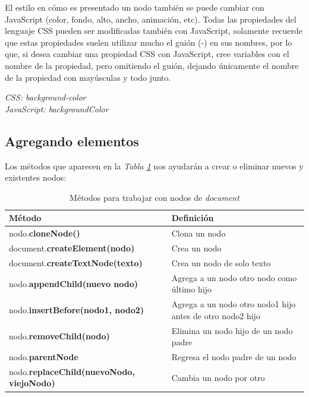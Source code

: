El estilo en cómo es presentado un nodo también se puede cambiar con JavaScript (color, fondo, alto, ancho, animación, etc). Todas las propiedades del lenguaje CSS pueden ser modificadas también con JavaScript, solamente recuerde que estas propiedades suelen utilizar mucho el guión (-) en sus nombres, por lo que, si desea cambiar una propiedad CSS con JavaScript, cree variables con el nombre de la propiedad, pero omitiendo el guión, dejando únicamente el nombre de la propiedad con mayúsculas y todo junto.
\begin{center}
    \textit{CSS: background-color\\JavaScript: backgroundColor}
\end{center}


\subsection{Agregando elementos}
\hspace{0.55cm}Los métodos que aparecen en la \textit{Tabla \ref{tab: 10}} nos ayudarán a crear o eliminar nuevos y existentes nodos:
\begin{table}[H]
    \begin{center}
        \caption{Métodos para trabajar con nodos de \textit{document}}
        \label{tab: 10}
        \begin{tabular}{m{6cm} m{7cm}}
            \hline
            \textbf{Método} & \textbf{Definición} \\
            \hline
            nodo.\textbf{cloneNode()}                           & Clona un nodo \\
            document.\textbf{createElement(nodo)}               & Crea un nodo \\
            document.\textbf{createTextNode(texto)}             & Crea un nodo de solo texto \\
            nodo.\textbf{appendChild(nuevo nodo)}               & Agrega a un nodo otro nodo como último hijo \\
            nodo.\textbf{insertBefore(nodo1, nodo2)}            & Agrega a un nodo otro nodo1 hijo antes de otro nodo2 hijo \\
            nodo.\textbf{removeChild(nodo)}                     & Elimina un nodo hijo de un nodo padre \\
            nodo.\textbf{parentNode}                            & Regresa el nodo padre de un nodo \\
            nodo.\textbf{replaceChild(nuevoNodo, viejoNodo)}    & Cambia un nodo por otro \\
            \hline
        \end{tabular}
    \end{center}    
\end{table}

